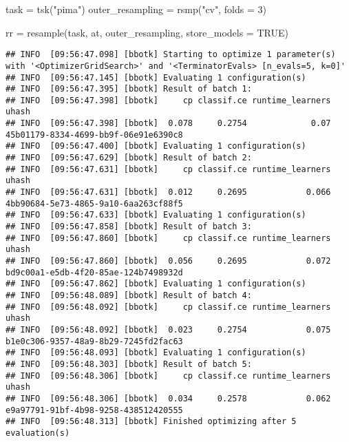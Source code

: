 \documentclass[
]{scrbook}
\newenvironment{Shaded}{\begin{snugshade}}{\end{snugshade}}
\newcommand{\AttributeTok}[1]{\textcolor[rgb]{0.77,0.63,0.00}{#1}}
\newcommand{\ConstantTok}[1]{\textcolor[rgb]{0.00,0.00,0.00}{#1}}
\newcommand{\DecValTok}[1]{\textcolor[rgb]{0.00,0.00,0.81}{#1}}
\newcommand{\FunctionTok}[1]{\textcolor[rgb]{0.00,0.00,0.00}{#1}}
\newcommand{\NormalTok}[1]{#1}
\newcommand{\OtherTok}[1]{\textcolor[rgb]{0.56,0.35,0.01}{#1}}
\newcommand{\StringTok}[1]{\textcolor[rgb]{0.31,0.60,0.02}{#1}}
\renewenvironment{Shaded} {\begin{snugshade}\small} {\end{snugshade}}
\begin{document}
\begin{Shaded}
\begin{Highlighting}[]
\NormalTok{task }\OtherTok{=} \FunctionTok{tsk}\NormalTok{(}\StringTok{"pima"}\NormalTok{)}
\NormalTok{outer\_resampling }\OtherTok{=} \FunctionTok{rsmp}\NormalTok{(}\StringTok{"cv"}\NormalTok{, }\AttributeTok{folds =} \DecValTok{3}\NormalTok{)}

\NormalTok{rr }\OtherTok{=} \FunctionTok{resample}\NormalTok{(task, at, outer\_resampling, }\AttributeTok{store\_models =} \ConstantTok{TRUE}\NormalTok{)}
\end{Highlighting}
\end{Shaded}

\begin{verbatim}
## INFO  [09:56:47.098] [bbotk] Starting to optimize 1 parameter(s) with '<OptimizerGridSearch>' and '<TerminatorEvals> [n_evals=5, k=0]' 
## INFO  [09:56:47.145] [bbotk] Evaluating 1 configuration(s) 
## INFO  [09:56:47.395] [bbotk] Result of batch 1: 
## INFO  [09:56:47.398] [bbotk]     cp classif.ce runtime_learners                                uhash 
## INFO  [09:56:47.398] [bbotk]  0.078     0.2754             0.07 45b01179-8334-4699-bb9f-06e91e6390c8 
## INFO  [09:56:47.400] [bbotk] Evaluating 1 configuration(s) 
## INFO  [09:56:47.629] [bbotk] Result of batch 2: 
## INFO  [09:56:47.631] [bbotk]     cp classif.ce runtime_learners                                uhash 
## INFO  [09:56:47.631] [bbotk]  0.012     0.2695            0.066 4bb90684-5e73-4865-9a10-6aa263cf88f5 
## INFO  [09:56:47.633] [bbotk] Evaluating 1 configuration(s) 
## INFO  [09:56:47.858] [bbotk] Result of batch 3: 
## INFO  [09:56:47.860] [bbotk]     cp classif.ce runtime_learners                                uhash 
## INFO  [09:56:47.860] [bbotk]  0.056     0.2695            0.072 bd9c00a1-e5db-4f20-85ae-124b7498932d 
## INFO  [09:56:47.862] [bbotk] Evaluating 1 configuration(s) 
## INFO  [09:56:48.089] [bbotk] Result of batch 4: 
## INFO  [09:56:48.092] [bbotk]     cp classif.ce runtime_learners                                uhash 
## INFO  [09:56:48.092] [bbotk]  0.023     0.2754            0.075 b1e0c306-9357-48a9-8b29-7245fd2fac63 
## INFO  [09:56:48.093] [bbotk] Evaluating 1 configuration(s) 
## INFO  [09:56:48.303] [bbotk] Result of batch 5: 
## INFO  [09:56:48.306] [bbotk]     cp classif.ce runtime_learners                                uhash 
## INFO  [09:56:48.306] [bbotk]  0.034     0.2578            0.062 e9a97791-91bf-4b98-9258-438512420555 
## INFO  [09:56:48.313] [bbotk] Finished optimizing after 5 evaluation(s) 

\end{verbatim}
\end{document}
